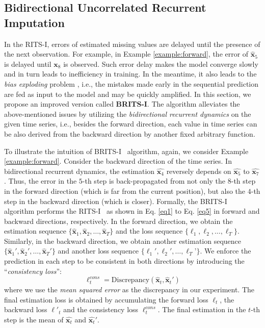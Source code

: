 \documentclass{article}
\newcommand{\ritsi}{\xspace{RITS-I}}
\newcommand{\britsi}{\xspace{BRITS-I}}
\newcommand{\x}{{\mathbf x}}
\begin{document}
\subsection{Bidirectional Uncorrelated Recurrent Imputation}
\label{sec:bi-direct}
In the \ritsi, errors of estimated missing values are delayed until the presence of the next observation.
For example, in Example \ref{example:forward}, the error of $\hat{\x}_5$ is delayed until $\x_8$ is observed. Such error delay makes the model converge slowly and in turn leads to inefficiency in training.  
In the meantime, it also leads to the {\em bias exploding} problem \cite{bengio2015scheduled}, i.e., the mistakes made early in the sequential prediction are fed as input to the model and may be quickly amplified. In this section, we propose an improved version called {\bf \britsi}. The  algorithm alleviates the above-mentioned issues by utilizing the {\em bidirectional recurrent dynamics} on the given time series, i.e., besides the forward direction, each value in time series can be also derived from the backward direction by another fixed arbitrary function.

To illustrate the intuition of \britsi~ algorithm, again, we consider Example \ref{example:forward}. Consider the backward direction of the time series. In bidirectional recurrent dynamics, the estimation $\hat{\x_4}$ reversely depends on $\hat{\x_5}$ to $\hat{\x_7}$. Thus, the error in the $5$-th step is back-propagated from not only the $8$-th step in the forward direction (which is far from the current position), but also the $4$-th step in the backward direction (which is closer).
Formally, the \britsi~ algorithm performs the \ritsi~ as shown in Eq. \eqref{eq1} to Eq. \eqref{eq5} in forward and backward directions, respectively. In the forward direction, we obtain the estimation sequence $\{\hat{\x}_1, \hat{\x}_2, \ldots, \hat{\x}_T\}$ and the loss sequence $\{\ell_1, \ell_2, \ldots, \ell_T\}$. Similarly, in the backward direction, we obtain another estimation sequence $\{{\hat{\x}_1}', {\hat{\x}_2}', \ldots, {\hat{\x}_T}'\}$ and another loss sequence $\{{\ell_1}', {\ell_2}', \ldots, {\ell_T}’\}$. We enforce the prediction in each step to be consistent in both directions by introducing the ``{\em consistency loss}'':
\begin{equation}
\label{eq:consist}
\ell_t^{cons} = \mathrm{Discrepancy}(\hat{\x}_t, {\hat{\x}_t}')
\end{equation}
where we use the {\em mean squared error} as the discrepancy in our experiment. The final estimation loss is obtained by accumulating the forward loss $\ell_t$, the backward loss $\ell'_t$ and the consistency loss $\ell^{cons}_t$. The final estimation in the $t$-th step is the mean of $\hat{\x_t}$ and $\hat{\x_t}'$.
\end{document}

